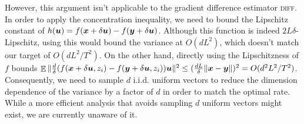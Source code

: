 However, this argument isn't applicable to the gradient difference estimator \textsc{diff}. In order to apply the concentration inequality, we need to bound the Lipschitz constant of $h({\boldsymbol{u}}) = f({\boldsymbol{x}}+\delta{\boldsymbol{u}}) - f({\boldsymbol{y}}+\delta{\boldsymbol{u}})$. Although this function is indeed $2L\delta$-Lipschitz, using this would bound the variance at $O(dL^2)$, which doesn't match our target of $O(dL^2/T^2)$. On the other hand, directly using the Lipschitzness of $f$ bounds $\mathop{\mathbb{E}}\|\frac{d}{\delta}(f({\boldsymbol{x}}+\delta{\boldsymbol{u}},z_i)-f({\boldsymbol{y}}+\delta{\boldsymbol{u}},z_i)){\boldsymbol{u}}\|^2 \le (\frac{dL}{\delta}\|{\boldsymbol{x}}-{\boldsymbol{y}}\|)^2 = O(d^2L^2/T^2)$. 
Consequently, we need to sample $d$ i.i.d. uniform vectors to reduce the dimension dependence of the variance by a factor of $d$ in order to match the optimal rate. 
While a more efficient analysis that avoids sampling $d$ uniform vectors might exist, we are currently unaware of it.
